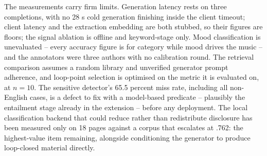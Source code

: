 \documentclass[conference]{IEEEtran}
\begin{document}
The measurements carry firm limits. Generation latency rests on three
completions, with no 28 s cold generation finishing inside the client
timeout; client latency and the extraction embedding are both stubbed,
so their figures are floors; the signal ablation is offline and
keyword-stage only. Mood classification is unevaluated -- every accuracy
figure is for category while mood drives the music -- and the
annotators were three authors with no calibration round. The retrieval
comparison assumes a random library and unverified generator prompt
adherence, and loop-point selection is optimised on the metric it is
evaluated on, at $n=10$. The sensitive detector's 65.5 percent miss
rate, including all non-English cases, is a defect to fix with a
model-based predicate -- plausibly the entailment stage already in the
extension -- before any deployment. The local classification backend
that could reduce rather than redistribute disclosure has been measured
only on 18 pages against a corpus that escalates at .762: the
highest-value item remaining, alongside conditioning the generator to
produce loop-closed material directly.
\end{document}
